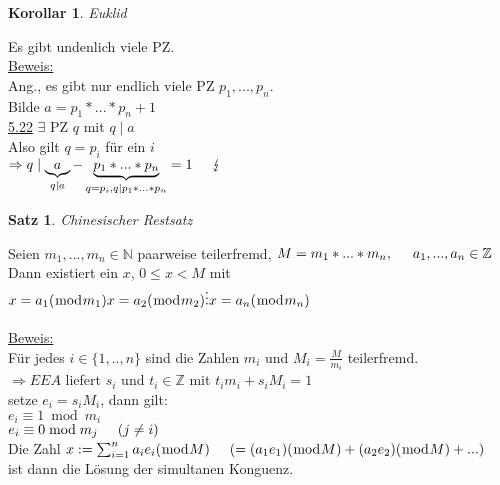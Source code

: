\documentclass[a4paper,11pt]{article}
\newtheorem{satz}[definition]{Satz}
\newtheorem{koro}[definition]{Korollar}
\newcommand{\hsp}{\hspace{5mm}}
\begin{document}
\newpage

\begin{koro}
	Euklid
\end{koro}
Es gibt undenlich viele PZ. \\
\underline{Beweis:} \\
Ang., es gibt nur endlich viele PZ $p_1,...,p_n$. \\
Bilde $a=p_1*...*p_n+1$ \\
\underline{5.22} $\exists$ PZ $q$ mit $q\mid a$ \\
Also gilt $q=p_i$ für ein $i$ \\
$\Rightarrow q\mid \underbrace{a}_{q\mid a}-\underbrace{p_1*...*p_n}_{q=p_i,q\mid p_1*...*p_n}=1\hsp\lightning$

\begin{satz}
	Chinesischer Restsatz
\end{satz}
Seien $m_1,...,m_n\in\mathbb{N}$ paarweise teilerfremd, $M=m_1*...*m_n,\hsp a_1,...,a_n\in\mathbb{Z}$ \\
Dann existiert ein $x$, $0\leq x<M$ mit \\
$x=a_1(\bmod m_1) \\
x=a_2(\bmod m_2) \\
\vdots \\
x=a_n(\bmod m_n)$ \\
\\
\underline{Beweis:} \\
Für jedes $i\in\{1,..,n\}$ sind die Zahlen $m_i$ und $M_i=\frac{M}{m_i}$ teilerfremd. \\
$\Rightarrow EEA$ liefert $s_i$ und $t_i\in\mathbb{Z}$ mit $t_im_i+s_iM_i=1$ \\
setze $e_i=s_iM_i$, dann gilt: \\
$e_i\equiv1\bmod m_i$ \\
$e_i\equiv0\bmod m_j\hsp(j\neq i)$ \\
Die Zahl $x:=\sum_{i=1}^na_ie_i(\bmod M)\hsp(=(a_1e_1)(\bmod M)+(a_2e_2)(\bmod M)+...)$ \\
ist dann die Lösung der simultanen Konguenz.
\end{document}
